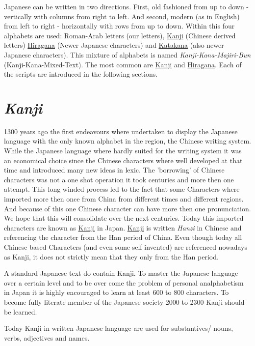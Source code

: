 Japanese can be written in two directions. First, old fashioned from up to down
- vertically with columns from right to left. And second, modern (as in
  English) from left to right - horizontally with rows from up to down. Within
  this four alphabets are used: Roman-Arab letters (our letters),
  \hyperref[sec:Kanji]{Kanji} (Chinese derived letters)
  \hyperref[sec:Hiragana]{Hiragana} (Newer Japanese characters) and
  \hyperref[sec:Katakana]{Katakana} (also newer Japanese characters).  This
  mixture of alphabets is named \textit{Kanji-Kana-Majiri-Bun}
  (Kanji-Kana-Mixed-Text). The most common are \hyperref[sec:Kanji]{Kanji} and
  \hyperref[sec:Hiragana]{Hiragana}. Each of the scripts are introduced in the
  following sections.

\section*{\textit{Kanji}} 

1300 years ago the first endeavours where undertaken to display the Japanese
language with the only known alphabet in the region, the Chinese writing
system. While the Japanese language where hardly suited for the writing system
it was an  economical choice since the Chinese characters where well developed
at that time and introduced many new ideas in lexic. The 'borrowing' of Chinese
characters was not a one shot operation it took centuries and more then one
attempt. This long winded process led to the fact that some Characters where
imported more then once from China from different times and different regions.
And because of this one Chinese character can have more then one pronunciation.
We hope that this will consolidate over the next centuries.  Today this
imported characters are known as \hyperref[sec:Kanji]{Kanji} in Japan.
\hyperref[sec:Kanji]{Kanji} is written \textit{Hanzi} in Chinese and
referencing the character from the Han period of China. Even though today all
Chinese based Characters (and even some self invented) are referenced nowadays
as Kanji, it does not strictly mean that they only from the Han period.

A standard Japanese text do contain Kanji. To master the Japanese language over
a certain level and to be over come the problem of personal analphabetism in
Japan it is highly encouraged to learn at least 600 to 800 characters. To
become fully literate member of the Japanese society 2000 to 2300 Kanji should
be learned. 

Today  Kanji in written Japanese language are used for substantives/ nouns,
verbs, adjectives and names. 

